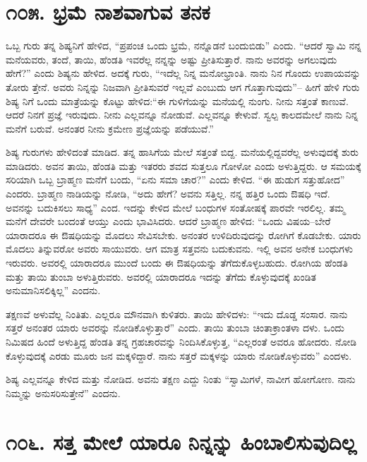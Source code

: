 \section{\num{೧೦೫. } ಭ್ರಮೆ ನಾಶವಾಗುವ ತನಕ}

ಒಬ್ಬ ಗುರು ತನ್ನ ಶಿಷ್ಯನಿಗೆ ಹೇಳಿದ, “ಪ್ರಪಂಚ ಒಂದು ಭ್ರಮೆ, ನನ್ನೊಡನೆ ಬಂದುಬಿಡು” ಎಂದು. “ಆದರೆ ಸ್ವಾಮಿ ನನ್ನ ಮನೆಯವರು, ತಂದೆ, ತಾಯಿ, ಹೆಂಡತಿ ಇವರೆಲ್ಲ ನನ್ನನ್ನು ಅಷ್ಟು ಪ್ರೀತಿಸುತ್ತಾರೆ. ನಾನು ಅವರನ್ನು ಅಗಲುವುದು ಹೇಗೆ?” ಎಂದು ಶಿಷ್ಯನು ಹೇಳಿದ. ಅದಕ್ಕೆ ಗುರು, “ಇದೆಲ್ಲ ನಿನ್ನ ಮನೋಭ್ರಾಂತಿ. ನಾನು ನಿನ ಗೊಂದು ಉಪಾಯವನ್ನು ತೋರು ತ್ತೇನೆ. ಅವರು ನಿನ್ನನ್ನು ನಿಜವಾಗಿ ಪ್ರೀತಿಸುವರೆ ಇಲ್ಲವೆ ಎಂಬುದು ಆಗ ಗೊತ್ತಾಗುವುದು”– ಹೀಗೆ ಹೇಳಿ ಗುರು ಶಿಷ್ಯ ನಿಗೆ ಒಂದು ಮಾತ್ರೆಯನ್ನು ಕೊಟ್ಟು ಹೇಳಿದ:“ಈ ಗುಳಿಗೆಯನ್ನು ಮನೆಯಲ್ಲಿ ನುಂಗು. ನೀನು ಸತ್ತಂತೆ ಕಾಣುವೆ. ಆದರೆ ನಿನಗೆ ಪ್ರಜ್ಞೆ ಇರುವುದು. ನೀನು ಎಲ್ಲವನ್ನೂ ನೋಡುವೆ. ಎಲ್ಲವನ್ನೂ ಕೇಳುವೆ. ಸ್ವಲ್ಪ ಕಾಲದಮೇಲೆ ನಾನು ನಿನ್ನ ಮನೆಗೆ ಬರುವೆ. ಅನಂತರ ನೀನು ಕ್ರಮೇಣ ಪ್ರಜ್ಞೆಯನ್ನು ಪಡೆಯುವೆ.” 

ಶಿಷ್ಯ ಗುರುಗಳು ಹೇಳಿದಂತೆ ಮಾಡಿದ. ತನ್ನ ಹಾಸಿಗೆಯ ಮೇಲೆ ಸತ್ತಂತೆ ಬಿದ್ದ. ಮನೆಯಲ್ಲಿದ್ದವರೆಲ್ಲ ಅಳುವುದಕ್ಕೆ ಶುರು ಮಾಡಿದರು. ಅವನ ತಾಯಿ, ಹೆಂಡತಿ ಮತ್ತು ಇತರರು ಶವದ ಸುತ್ತಲೂ ಗೋಳೋ ಎಂದು ಅಳುತ್ತಿದ್ದರು. ಆ ಸಮಯಕ್ಕೆ ಸರಿಯಾಗಿ ಒಬ್ಬ ಬ್ರಾಹ್ಮಣ ಮನೆಗೆ ಬಂದು, “ಏನು ಸಮಾ ಚಾರ?” ಎಂದು ಕೇಳಿದ. “ಈ ಹುಡುಗ ಸತ್ತುಹೋದ” ಎಂದರು. ಬ್ರಾಹ್ಮಣ ನಾಡಿಯನ್ನು ನೋಡಿ, “ಅದು ಹೇಗೆ? ಅವನು ಸತ್ತಿಲ್ಲ. ನನ್ನ ಹತ್ತಿರ ಒಂದು ಔಷಧಿ ಇದೆ. ಅವನನ್ನು ಬದುಕಿಸಲು ಸಾಧ್ಯ” ಎಂದ. ಇದನ್ನು ಕೇಳಿದ ಮೇಲೆ ಬಂಧುಗಳ ಸಂತೋಷಕ್ಕೆ ಪಾರವೇ ಇರಲಿಲ್ಲ. ತಮ್ಮ ಮನೆಗೆ ದೇವರೇ ಬಂದಂತೆ ಆಯ್ತು ಎಂದು ಭಾವಿಸಿದರು. ಆದರೆ ಬ್ರಾಹ್ಮಣ ಹೇಳಿದ: “ಒಂದು ವಿಷಯ–ಬೇರೆ ಯಾರಾದರೂ ಈ ಔಷಧಿಯನ್ನು ಮೊದಲು ಸೇವಿಸಬೇಕು. ಅನಂತರ ಉಳಿದಿರುವುದನ್ನು ರೋಗಿಗೆ ಕೊಡಬೇಕು. ಯಾರು ಮೊದಲು ತಿನ್ನುವರೋ ಅವರು ಸಾಯುವರು. ಆಗ ಮಾತ್ರ ಸತ್ತವನು ಬದುಕುವನು. ಇಲ್ಲಿ ಅವನ ಅನೇಕ ಬಂಧುಗಳು ಇರುವರು. ಅವರಲ್ಲಿ ಯಾರಾದರೂ ಮುಂದೆ ಬಂದು ಈ ಔಷಧಿಯನ್ನು ತೆಗೆದುಕೊಳ್ಳಬಹುದು. ರೋಗಿಯ ಹೆಂಡತಿ ಮತ್ತು ತಾಯಿ ತುಂಬಾ ಅಳುತ್ತಿರುವರು. ಅವರಲ್ಲಿ ಯಾರಾದರೂ ಇದನ್ನು ತೆಗೆದು ಕೊಳ್ಳುವುದಕ್ಕೆ ಖಂಡಿತ ಅನುಮಾನಿಸಲಿಕ್ಕಿಲ್ಲ” ಎಂದನು.

ತಕ್ಷಣವೆ ಅಳುವೆಲ್ಲ ನಿಂತಿತು. ಎಲ್ಲರೂ ಮೌನವಾಗಿ ಕುಳಿತರು. ತಾಯಿ ಹೇಳಿದಳು: “ಇದು ದೊಡ್ಡ ಸಂಸಾರ. ನಾನು ಸತ್ತರೆ ಅನಂತರ ಯಾರು ಅವರನ್ನು ನೋಡಿಕೊಳ್ಳುತ್ತಾರೆ” ಎಂದು. ತಾಯಿ ತುಂಬಾ ಚಿಂತಾಕ್ರಾಂತಳಾ ದಳು. ಒಂದು ನಿಮಿಷದ ಹಿಂದೆ ಅಳುತ್ತಿದ್ದ ಹೆಂಡತಿ ತನ್ನ ಗ್ರಹಚಾರವನ್ನು ನಿಂದಿಸಿಕೊಳ್ಳುತ್ತ, “ಎಲ್ಲರಂತೆ ಅವರೂ ಹೋದರು. ನೋಡಿ ಕೊಳ್ಳುವುದಕ್ಕೆ ಎರಡು ಮೂರು ಜನ ಮಕ್ಕಳಿದ್ದಾರೆ. ನಾನು ಸತ್ತರೆ ಮಕ್ಕಳನ್ನು ಯಾರು ನೋಡಿಕೊಳ್ಳುವರು” ಎಂದಳು.

ಶಿಷ್ಯ ಎಲ್ಲವನ್ನೂ ಕೇಳಿದ ಮತ್ತು ನೋಡಿದ. ಅವನು ತಕ್ಷಣ ಎದ್ದು ನಿಂತು “ಸ್ವಾಮಿಗಳೆ, ನಾವೀಗ ಹೋಗೋಣ. ನಾನು ನಿಮ್ಮನ್ನು ಅನುಸರಿಸುತ್ತೇನೆ” ಎಂದನು.


\section{\num{೧೦೬. } ಸತ್ತ ಮೇಲೆ ಯಾರೂ ನಿನ್ನನ್ನು ಹಿಂಬಾಲಿಸುವುದಿಲ್ಲ}

